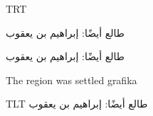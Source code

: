 \documentclass{article}
\begin{document}
\pokus


\pardir TRT



طالع أيضًا: إبراهيم بن يعقوب



\arab

طالع أيضًا: إبراهيم بن يعقوب

\libertine

The region was settled grafika %

\pardir TLT
\arab
طالع أيضًا: إبراهيم بن يعقوب

\end{document}
